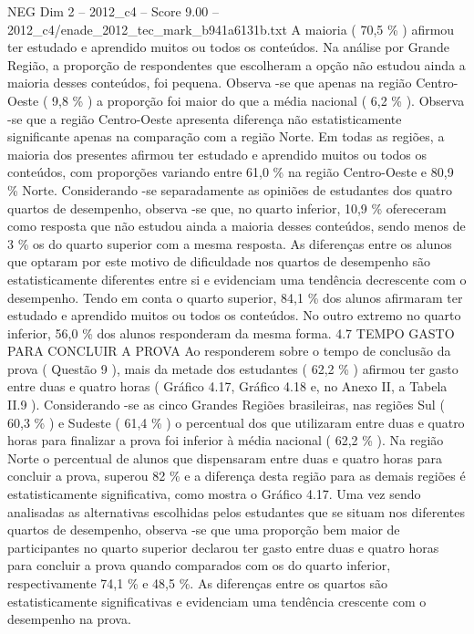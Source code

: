 \begin{textsample}{NEG Dim 2 – 2012\_c4 – Score 9.00 – 2012\_c4/enade\_2012\_tec\_mark\_b941a6131b.txt}
A maioria ( 70,5 \% ) afirmou ter estudado e aprendido muitos ou todos os conteúdos.
Na análise por Grande Região, a proporção de respondentes que escolheram a opção não estudou ainda a maioria desses conteúdos, foi pequena.
Observa -se que apenas na região Centro-Oeste ( 9,8 \% ) a proporção foi maior do que a média nacional ( 6,2 \% ).
Observa -se que a região Centro-Oeste apresenta diferença não estatisticamente significante apenas na comparação com a região Norte.
Em todas as regiões, a maioria dos presentes afirmou ter estudado e aprendido muitos ou todos os conteúdos, com proporções variando entre 61,0 \% na região Centro-Oeste e 80,9 \% Norte.
Considerando -se separadamente as opiniões de estudantes dos quatro quartos de desempenho, observa -se que, no quarto inferior, 10,9 \% ofereceram como resposta que não estudou ainda a maioria desses conteúdos, sendo menos de 3 \% os do quarto superior com a mesma resposta.
As diferenças entre os alunos que optaram por este motivo de dificuldade nos quartos de desempenho são estatisticamente diferentes entre si e evidenciam uma tendência decrescente com o desempenho.
Tendo em conta o quarto superior, 84,1 \% dos alunos afirmaram ter estudado e aprendido muitos ou todos os conteúdos.
No outro extremo no quarto inferior, 56,0 \% dos alunos responderam da mesma forma. 4.7 TEMPO GASTO PARA CONCLUIR A PROVA Ao responderem sobre o tempo de conclusão da prova ( Questão 9 ), mais da metade dos estudantes ( 62,2 \% ) afirmou ter gasto entre duas e quatro horas ( Gráfico 4.17, Gráfico 4.18 e, no Anexo II, a Tabela II.9 ).
Considerando -se as cinco Grandes Regiões brasileiras, nas regiões Sul ( 60,3 \% ) e Sudeste ( 61,4 \% ) o percentual dos que utilizaram entre duas e quatro horas para finalizar a prova foi inferior à média nacional ( 62,2 \% ).
Na região Norte o percentual de alunos que dispensaram entre duas e quatro horas para concluir a prova, superou 82 \% e a diferença desta região para as demais regiões é estatisticamente significativa, como mostra o Gráfico 4.17.
Uma vez sendo analisadas as alternativas escolhidas pelos estudantes que se situam nos diferentes quartos de desempenho, observa -se que uma proporção bem maior de participantes no quarto superior declarou ter gasto entre duas e quatro horas para concluir a prova quando comparados com os do quarto inferior, respectivamente 74,1 \% e 48,5 \%.
As diferenças entre os quartos são estatisticamente significativas e evidenciam uma tendência crescente com o desempenho na prova.

\end{textsample}
